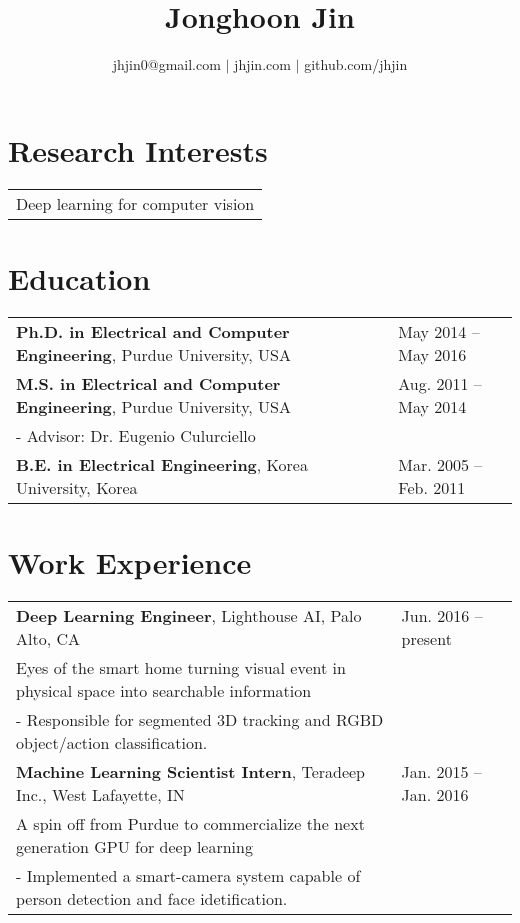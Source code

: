 \documentclass[11pt]{article}
\title{\vspace{-40pt}\bfseries\huge Jonghoon Jin \vspace{-20pt}}
\author{
\small jhjin0@gmail.com $\vert$ jhjin.com $\vert$ github.com/jhjin \\
}
\date{\vspace{-20pt}}
\begin{document}
\maketitle


\section*{Research Interests}
\begin{tabular}{L{\textwidth}}
  Deep learning for computer vision \\
\end{tabular}

\section*{Education}
\begin{tabular}{L{0.72\textwidth} R{0.22\textwidth}}
  {\bf Ph.D. in Electrical and Computer Engineering}, Purdue University, USA       & May 2014 -- May 2016 \\ [0pt]
  {\bf M.S. in Electrical and Computer Engineering}, Purdue University, USA        & Aug. 2011 -- May 2014 \\ [0pt]
  - Advisor: Dr. Eugenio Culurciello \\ [7pt]
  {\bf B.E. in Electrical Engineering}, Korea University, Korea                    & Mar. 2005 -- Feb. 2011 \\ [0pt]
\end{tabular}

\section*{Work Experience}
\begin{tabular}{L{0.74\textwidth} R{0.2\textwidth}}
  {\bf Deep Learning Engineer}, Lighthouse AI, Palo Alto, CA                       & Jun. 2016 -- present \\ [0pt]
  Eyes of the smart home turning visual event in physical space into searchable information \\
  - Responsible for segmented 3D tracking and RGBD object/action classification. \\ [7pt]
  {\bf Machine Learning Scientist Intern}, Teradeep Inc., West Lafayette, IN       & Jan. 2015 -- Jan. 2016 \\ [0pt]
  A spin off from Purdue to commercialize the next generation GPU for deep learning \\
  - Implemented a smart-camera system capable of person detection and face idetification. \\
\end{tabular}
\end{document}
